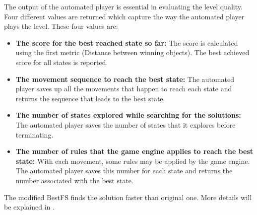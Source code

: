 The output of the automated player is essential in evaluating the level quality. Four different values are returned which capture the way the automated player plays the level. These four values are:
\begin{itemize} \itemsep0pt \parskip0pt 
	\item \textbf{The score for the best reached state so far:} The score is calculated using the first metric (Distance between winning objects). The best achieved score for all states is reported.
	\item \textbf{The movement sequence to reach the best state:} The automated player saves up all the movements that happen to reach each state and returns the sequence that leads to the best state.
	\item \textbf{The number of states explored while searching for the solutions:} The automated player saves the number of states that it explores before terminating.
	\item \textbf{The number of rules that the game engine applies to reach the best state:} With each movement, some rules may be applied by the game engine. The automated player saves this number for each state and returns the number associated with the best state.
\end{itemize}
The modified BestFS finds the solution faster than original one. More details will be explained in .\\\par

